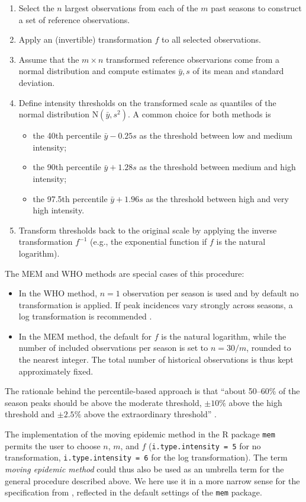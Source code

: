 \documentclass{article}
\newcommand{\sd}{s}
\newcommand{\mean}{\bar{y}}
\begin{document}
\begin{enumerate}
\item Select the $n$ largest observations from each of the $m$ past seasons to construct a set of reference observations.
\item Apply an (invertible) transformation $f$ to all selected observations.
\item Assume that the $m \times n$ transformed reference observarions come from a normal distribution and compute estimates $\mean, \sd$ of its mean and standard deviation.
\item Define intensity thresholds on the transformed scale as quantiles of the normal distribution N$(\mean, \sd^2)$. A common choice for both methods is
\begin{itemize}
\item the 40th percentile $\mean - 0.25 \sd$ as the threshold between low and medium intensity;
\item the 90th percentile $\mean + 1.28 \sd$ as the threshold between medium and high intensity;
\item the 97.5th percentile $\mean + 1.96\sd$ as the threshold between high and very high intensity.
\end{itemize}
\item Transform thresholds back to the original scale by applying the inverse transformation $f^{-1}$ (e.g., the exponential function if $f$ is the natural logarithm).
\end{enumerate}

\noindent The MEM and WHO methods are special cases of this procedure:
\begin{itemize}
\item In the WHO method, $n = 1$ observation per season is used and by default no transformation is applied. If peak incidences vary strongly across seasons, a log transformation is recommended \citep{WHO2017}. 
\item In the MEM method, the default for $f$ is the natural logarithm, while the number of included observations per season is set to $n = 30/m$, rounded to the nearest integer. The total number of historical observations is thus kept approximately fixed.
\end{itemize}
The rationale behind the percentile-based approach is that ``about 50--60\% of the season peaks should be above the moderate threshold, $\pm 10\%$ above the high threshold and $\pm 2.5\%$ above the extraordinary threshold'' \citep{WHO2017}.

The implementation of the moving epidemic method in the R package \texttt{mem} \citep{Lozano2020} permits the user to choose $n$, $m$, and $f$ (\texttt{i.type.intensity	= 5} for no transformation, \texttt{i.type.intensity = 6} for the log transformation). The term \textit{moving epidemic method} could thus also be used as an umbrella term for the general procedure described above. We here use it in a more narrow sense for the specification from \cite{Vega2015}, reflected in the default settings of the \texttt{mem} package.
\end{document}
